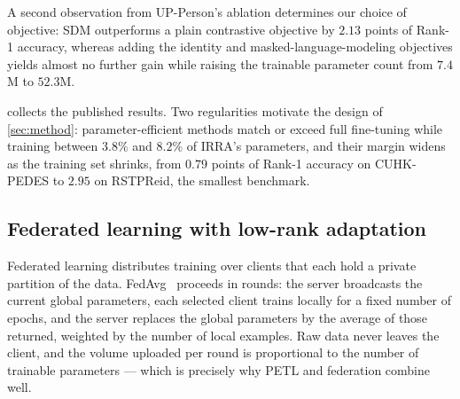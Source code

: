 A second observation from UP-Person's ablation determines our choice of objective: SDM outperforms a plain contrastive objective by $2.13$ points of Rank-1 accuracy, whereas adding the identity and masked-language-modeling objectives yields almost no further gain while raising the trainable parameter count from $7.4$M to $52.3$M.

 collects the published results. Two regularities motivate the design of \cref{sec:method}: parameter-efficient methods match or exceed full fine-tuning while training between $3.8\%$ and $8.2\%$ of IRRA's parameters, and their margin widens as the training set shrinks, from $0.79$ points of Rank-1 accuracy on CUHK-PEDES to $2.95$ on RSTPReid, the smallest benchmark.

\begin{table}[t]
\centering\small
\caption{Published Rank-1 accuracy (\%) of full fine-tuning and parameter-efficient methods on CLIP ViT-B/16. Memory figures are those quoted in the respective papers and were not measured under a common protocol.}\label{tab:ftvspeft}
\end{table}

\subsection{Federated learning with low-rank adaptation}\label{sec:fedavg-rw}

Federated learning distributes training over clients that each hold a private partition of the data. FedAvg~\citep{mcmahan2023communicationefficientlearningdeepnetworks} proceeds in rounds: the server broadcasts the current global parameters, each selected client trains locally for a fixed number of epochs, and the server replaces the global parameters by the average of those returned, weighted by the number of local examples. Raw data never leaves the client, and the volume uploaded per round is proportional to the number of trainable parameters --- which is precisely why PETL and federation combine well.

